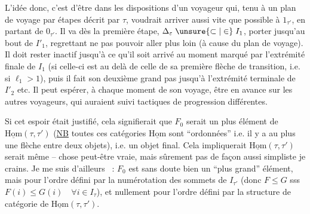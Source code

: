 L'idée donc, c'est d'être dans les dispositions d'un voyageur qui, tenu à un plan de voyage par étapes décrit par $\tau$, voudrait arriver aussi vite que possible à $1_{\tau'}$, en partant de $0_{\tau'}$. Il va dès la première étape, \deleted{\unsure{$\Delta$}} $\Delta_\varepsilon\mathrel{\unsure{\subset|\in}}I_1$,  porter jusqu'au bout de $I'_1$, regrettant ne pas pouvoir aller plus loin (à cause du plan de voyage). Il doit rester inactif jusqu'à ce qu'il soit arrivé au  moment marqué par l'extrémité finale de $I_1$ (si celle-ci est au delà de celle de sa première flèche de transition, i.e. si $\ell_1>1$), puis il fait son deuxième grand pas jusqu'à l'extrémité terminale de $I'_2$ etc. Il peut espérer, à chaque moment de son voyage, être en avance  sur les autres voyageurs, qui auraient suivi  \deleted{\unsure{$\beta$}} tactiques de progression différentes.

Si  cet espoir était justifié, cela signifierait que $F_0$ serait un plus   élément de $\underline{\mathrm{Hom}}(\tau,\tau')$ (\uline{NB} toutes ces catégories $\underline{\mathrm{Hom}}$  sont ``ordonnées'' i.e. il y a au plus une flèche entre deux objets), i.e. un objet  final. Cela impliquerait  $\underline{\mathrm{Hom}}(\tau,\tau')$ serait même  -- chose peut-être vraie, mais sûrement pas de façon aussi simpliste je crains. Je me suis d'ailleurs ~:
$F_0$ est  sans doute bien un ``plus grand''  élément, mais pour l'ordre défini par la numérotation des sommets de $I_{\tau'}$ (donc $F\leq G$ sss $F(i)\leq G(i)\quad\forall i\in I_\tau$), et nullement pour l'ordre défini par la structure de catégorie de $\underline{\mathrm{Hom}}(\tau,\tau')$.
